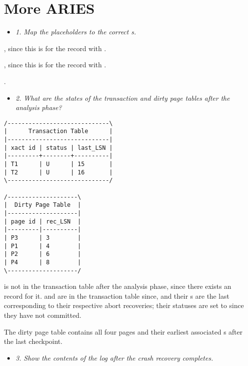 \newpage
\section{More ARIES}

\begin{itemize}
  \item \textit{1. Map the placeholders  to the correct s.}
\end{itemize}

, since this  is for the  record with .
\smallskip

, since this  is for the  record with .
\smallskip

.

\streg

\begin{itemize}
  \item \textit{2. What are the states of the transaction and dirty page tables
    after the analysis phase?}
\end{itemize}


\begin{verbatim}
/-----------------------------\
|      Transaction Table      |
|-----------------------------|
| xact id | status | last_LSN |
|---------+--------+----------|
| T1      | U      | 15       |
| T2      | U      | 16       |
\-----------------------------/

/--------------------\
|  Dirty Page Table  |
|--------------------|
| page id | rec_LSN  |
|---------|----------|
| P3      | 3        |
| P1      | 4        |
| P2      | 6        |
| P4      | 8        |
\--------------------/
\end{verbatim}

 is not in the transaction table after the analysis phase, since there
exists an  record for it.  and  are in the transaction
table since, and their \ms{lastLSN}s are the last \ms{CLR} corresponding to their
respective abort recoveries; their statuses are set to \ms{U} since they have
not committed. \smallskip

The dirty page table contains all four pages and their earliest associated
s after the last checkpoint.

\streg

\begin{itemize}
  \item \textit{3. Show the contents of the log after the crash recovery
    completes.}
\end{itemize}

